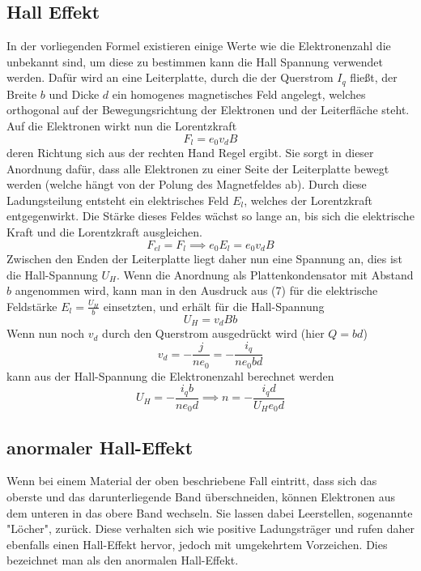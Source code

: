 \subsection{Hall Effekt}
In der vorliegenden Formel existieren einige Werte wie die Elektronenzahl die unbekannt sind, um diese zu bestimmen kann die Hall Spannung verwendet werden. Dafür wird an eine Leiterplatte, durch die der Querstrom $I_q$ fließt, der Breite $b$ und Dicke $d$ ein homogenes magnetisches Feld angelegt, welches orthogonal auf der Bewegungsrichtung der Elektronen und der Leiterfläche steht. Auf die Elektronen wirkt nun die Lorentzkraft
\begin{equation*}
F_l=e_0v_dB
\end{equation*}
deren Richtung sich aus der rechten Hand Regel ergibt. Sie sorgt in dieser Anordnung dafür, dass alle Elektronen zu einer Seite der Leiterplatte bewegt werden (welche hängt von der Polung des Magnetfeldes ab). Durch diese Ladungsteilung entsteht ein elektrisches Feld $E_l$, welches der Lorentzkraft entgegenwirkt. Die Stärke dieses Feldes wächst so lange an, bis sich die elektrische Kraft und die Lorentzkraft ausgleichen.
\begin{equation}
F_{el}=F_l \implies   e_0E_l=e_0v_dB
\end{equation}
Zwischen den Enden der Leiterplatte liegt daher nun eine Spannung an, dies ist die Hall-Spannung $U_H$. Wenn die Anordnung als Plattenkondensator mit Abstand $b$ angenommen wird, kann man in den Ausdruck aus (7) für die elektrische Feldstärke $E_l=\frac{U_H}{b}$ einsetzten, und erhält für die Hall-Spannung
\begin{equation}
U_H=v_dBb
\end{equation}
Wenn nun noch $v_d$ durch den Querstrom ausgedrückt wird (hier $Q=bd$)
\begin{equation}
v_d=-\frac{j}{ne_0}=-\frac{i_q}{ne_0bd}
\end{equation}
kann aus der Hall-Spannung die Elektronenzahl berechnet werden
\begin{equation}
U_H=-\frac{i_qb}{ne_0d} \implies n=-\frac{i_qd}{U_He_0d}
\end{equation}
\subsection{anormaler Hall-Effekt}
Wenn bei einem Material der oben beschriebene Fall eintritt, dass sich das oberste und das darunterliegende Band überschneiden, können Elektronen aus dem unteren in das obere Band wechseln. Sie lassen dabei Leerstellen, sogenannte "Löcher", zurück. Diese verhalten sich wie positive Ladungsträger und rufen daher ebenfalls einen Hall-Effekt hervor, jedoch mit umgekehrtem Vorzeichen. Dies bezeichnet man als den anormalen Hall-Effekt. 
